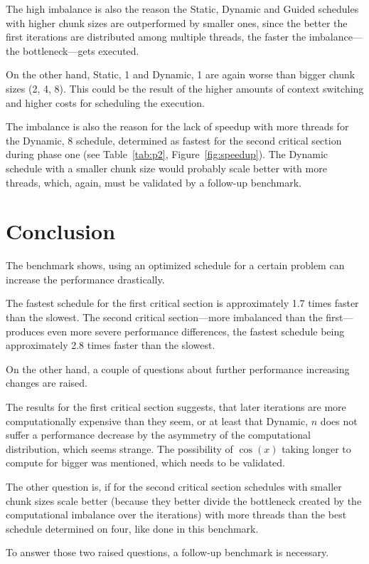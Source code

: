\documentclass[twoside,11pt]{article}
\begin{document}
The high imbalance is also the reason the Static, Dynamic
and Guided schedules with higher chunk sizes are
outperformed by smaller ones, since the better the first
iterations are distributed among multiple threads, the
faster the imbalance---the bottleneck---gets executed.

On the other hand, Static, 1 and Dynamic, 1 are again
worse than bigger chunk sizes (2, 4, 8).
This could be the result of the higher amounts of context
switching and higher costs for scheduling the execution.

The imbalance is also the reason for the lack of speedup
with more threads for the Dynamic, 8 schedule, determined
as fastest for the second critical section during phase one
(see Table~\ref{tab:p2}, Figure~\ref{fig:speedup}).
The Dynamic schedule with a smaller chunk size would
probably scale better with more threads, which, again,
must be validated by a follow-up benchmark.


\section{Conclusion} %

The benchmark shows, using an optimized schedule for
a certain problem can increase the performance drastically.

The fastest schedule for the first critical section is
approximately 1.7 times faster than the slowest.
The second critical section---more imbalanced than the
first---produces even more severe performance differences,
the fastest schedule being approximately 2.8 times faster
than the slowest.

On the other hand, a couple of questions about further
performance increasing changes are raised.

The results for the first critical section suggests, that
later iterations are more computationally expensive than
they seem, or at least that Dynamic, $n$ does not suffer
a performance decrease by the asymmetry of the
computational distribution, which seems strange.
The possibility of $\cos(x)$ taking longer to compute for
bigger was mentioned, which needs to be validated.

The other question is, if for the second critical section
schedules with smaller chunk sizes scale better (because
they better divide the bottleneck created by the
computational imbalance over the iterations) with more
threads than the best schedule determined on four, like
done in this benchmark.

To answer those two raised questions, a follow-up benchmark
is necessary.



\end{document}
